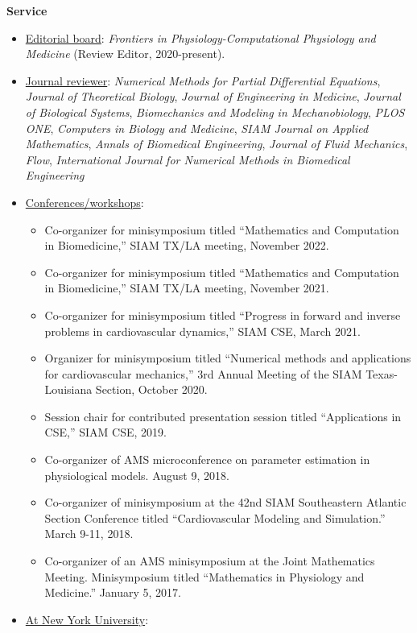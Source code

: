 \documentclass{article} %
\begin{document}
\vspace{0.5cm}
\noindent
{\bf \large Service}
\begin{itemize}
\item \underline{Editorial board}: {\em Frontiers in Physiology-Computational Physiology and Medicine} (Review Editor, 2020-present).
\item \underline{Journal reviewer}: {\em Numerical Methods for Partial Differential Equations}, {\em Journal of Theoretical Biology}, {\em Journal of Engineering in Medicine}, {\em Journal of Biological Systems}, {\em Biomechanics and Modeling in Mechanobiology}, {\em PLOS ONE}, {\em Computers in Biology and Medicine}, {\em SIAM Journal on Applied Mathematics}, {\em Annals of Biomedical Engineering}, {\em Journal of Fluid Mechanics}, {\em Flow}, {\em International Journal for Numerical Methods in Biomedical Engineering}
\item \underline{Conferences/workshops}:
\begin{itemize}
\item Co-organizer for minisymposium titled ``Mathematics and Computation in Biomedicine,'' SIAM TX/LA meeting, November 2022.
\item Co-organizer for minisymposium titled ``Mathematics and Computation in Biomedicine,'' SIAM TX/LA meeting, November 2021.
\item Co-organizer for minisymposium titled ``Progress in forward and inverse problems in cardiovascular dynamics,'' SIAM CSE, March 2021.
\item Organizer for minisymposium titled ``Numerical methods and applications for cardiovascular mechanics,'' 3rd Annual Meeting of the
SIAM Texas-Louisiana Section, October 2020. 
\item Session chair for contributed presentation session titled ``Applications in CSE,'' SIAM CSE, 2019.
\item Co-organizer of AMS microconference on parameter estimation in physiological models.  August 9, 2018.
\item Co-organizer of minisymposium at the 42nd SIAM Southeastern Atlantic Section Conference titled ``Cardiovascular Modeling and Simulation.'' March 9-11, 2018. 
\item Co-organizer of an AMS minisymposium at the Joint Mathematics Meeting. Minisymposium titled ``Mathematics in Physiology and Medicine.'' January 5, 2017.
\end{itemize}
\item \underline{At New York University}:
\begin{itemize}

\end{itemize}
\end{itemize}
\end{document}
